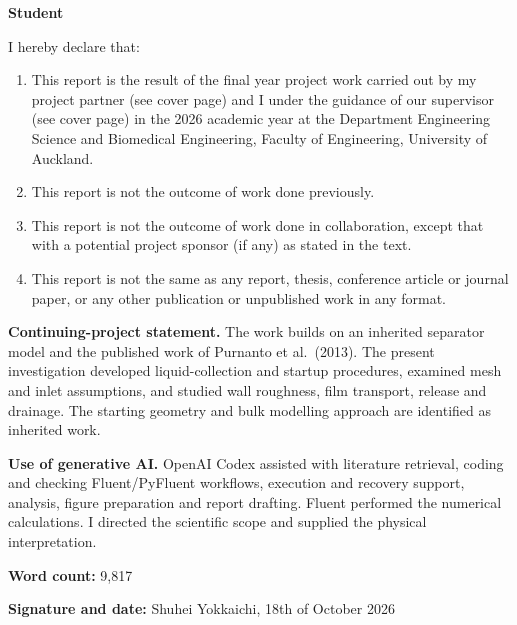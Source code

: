 \documentclass[12pt]{article}
\newcommand{\tightlist}{\setlength{\itemsep}{0pt}\setlength{\parskip}{0pt}}
\begin{document}
\clearpage

\textbf{Student}

I hereby declare that:

\begin{enumerate}
\def\labelenumi{\arabic{enumi}.}
\tightlist
\item
  This report is the result of the final year project work carried out by my project partner (see cover page) and I under the guidance of our supervisor (see cover page) in the 2026 academic year at the Department Engineering Science and Biomedical Engineering, Faculty of Engineering, University of Auckland.
\item
  This report is not the outcome of work done previously.
\item
  This report is not the outcome of work done in collaboration, except that with a potential project sponsor (if any) as stated in the text.
\item
  This report is not the same as any report, thesis, conference article or journal paper, or any other publication or unpublished work in any format.
\end{enumerate}

\textbf{Continuing-project statement.} The work builds on an inherited separator model and the published work of Purnanto et al.~(2013). The present investigation developed liquid-collection and startup procedures, examined mesh and inlet assumptions, and studied wall roughness, film transport, release and drainage. The starting geometry and bulk modelling approach are identified as inherited work.

\textbf{Use of generative AI.} OpenAI Codex assisted with literature retrieval, coding and checking Fluent/PyFluent workflows, execution and recovery support, analysis, figure preparation and report drafting. Fluent performed the numerical calculations. I directed the scientific scope and supplied the physical interpretation.

\textbf{Word count:} 9,817

\textbf{Signature and date:} Shuhei Yokkaichi, 18th of October 2026

\clearpage
\tableofcontents\clearpage\listoffigures\clearpage\listoftables\clearpage
\end{document}

